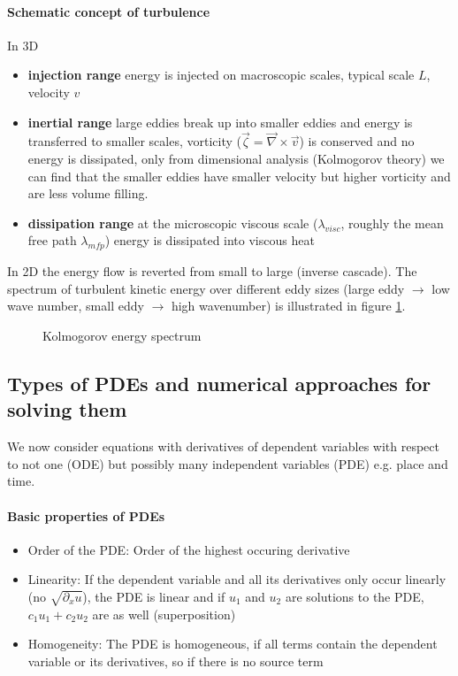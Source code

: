 \paragraph*{Schematic concept of turbulence}
In 3D
\begin{itemize}
    \item \textbf{injection range} energy is injected on macroscopic scales, typical scale $L$, velocity $v$
    \item \textbf{inertial range} large eddies break up into smaller eddies and energy is transferred to smaller scales, vorticity ($\vec{\zeta} = \vec{\nabla}\times \vec{v}$) is conserved and no energy is dissipated,
    only from dimensional analysis (Kolmogorov theory) we can find that the smaller eddies have smaller velocity but higher
    vorticity and are less volume filling.
    \item \textbf{dissipation range} at the microscopic viscous scale ($\lambda_{visc}$, roughly the mean free path $\lambda_{mfp}$) energy is dissipated into viscous heat
\end{itemize}
In 2D the energy flow is reverted from small to large (inverse cascade). The
spectrum of turbulent kinetic energy over different eddy sizes (large
eddy $\rightarrow$ low wave number, small eddy $\rightarrow$ high wavenumber)
is illustrated in figure \ref{fig:kolmogorov_spectrum_s}.

\begin{figure}[!htb]
    \centering
    
    \caption{Kolmogorov energy spectrum}
    \label{fig:kolmogorov_spectrum_s}
\end{figure}

\subsection*{Types of PDEs and numerical approaches for solving them}
We now consider equations with derivatives of dependent variables
with respect to not one (ODE) but possibly many independent variables
(PDE) e.g. place and time.

\paragraph*{Basic properties of PDEs}
\begin{itemize}
    \item \textcolor{blue1}{Order of the PDE:} Order of the highest occuring derivative
    \item \textcolor{blue1}{Linearity:} If the dependent variable and all its derivatives only occur linearly (no $\sqrt{\partial_x u}$), the PDE is linear and if $u_1$ and $u_2$ are solutions to the PDE, $c_1u_1+c_2u_2$ are as well (\textcolor{blue1}{superposition})
    \item \textcolor{blue1}{Homogeneity:} The PDE is homogeneous, if all terms contain the dependent variable or its derivatives, so if there is no source term
\end{itemize}

